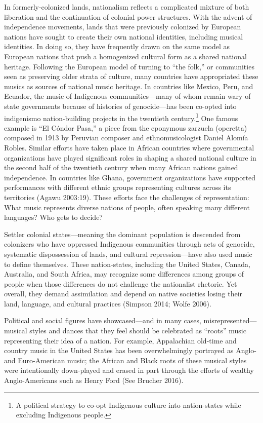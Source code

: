 \documentclass[twoside]{article}
\begin{document}
In formerly-colonized lands, nationalism reflects a complicated mixture
of both liberation and the continuation of colonial power structures.
With the advent of independence movements, lands that were previously
colonized by European nations have sought to create their own national
identities, including musical identities. In doing so, they have
frequently drawn on the same model as European nations that push a
homogenized cultural form as a shared national heritage. Following the
European model of turning to ``the folk,'' or communities seen as
preserving older strata of culture, many countries have appropriated
these musics as sources of national music heritage. In countries like
Mexico, Peru, and Ecuador, the music of Indigenous communities---many of
whom remain wary of state governments because of histories of
genocide---has been co-opted into indigenismo nation-building projects
in the twentieth century.\footnote{A political strategy to co-opt
  Indigenous culture into nation-states while excluding Indigenous
  people.} One famous example is ``El Cóndor Pasa,'' a piece from the
eponymous zarzuela (operetta) composed in 1913 by Peruvian composer and
ethnomusicologist Daniel Alomía Robles. Similar efforts have taken place
in African countries where governmental organizations have played
significant roles in shaping a shared national culture in the second
half of the twentieth century when many African nations gained
independence. In countries like Ghana, government organizations have
supported performances with different ethnic groups representing
cultures across its territories (Agawu 2003:19). These efforts face the
challenges of representation: What music represents diverse nations of
people, often speaking many different languages? Who gets to decide?

Settler colonial states---meaning the dominant population is descended from colonizers who have oppressed Indigenous communities through acts of genocide, systematic dispossession of lands, and cultural repression---have also used music to define themselves. These nation-states, including the United States, Canada, Australia, and South Africa, may recognize some differences among groups of people when those differences do not challenge the nationalist rhetoric. Yet overall, they demand assimilation and depend on native societies losing their land, language, and cultural practices (Simpson 2014; Wolfe 2006).

Political and social figures have showcased---and in many cases, misrepresented---musical styles and dances that they feel should be celebrated as ``roots'' music representing their idea of a nation. For example, Appalachian old-time and country music in the United States has been overwhelmingly portrayed as Anglo- and Euro-American music; the African and Black roots of these musical styles were intentionally down-played and erased in part through the efforts of wealthy Anglo-Americans such as Henry Ford (See Brucher 2016).
\end{document}
